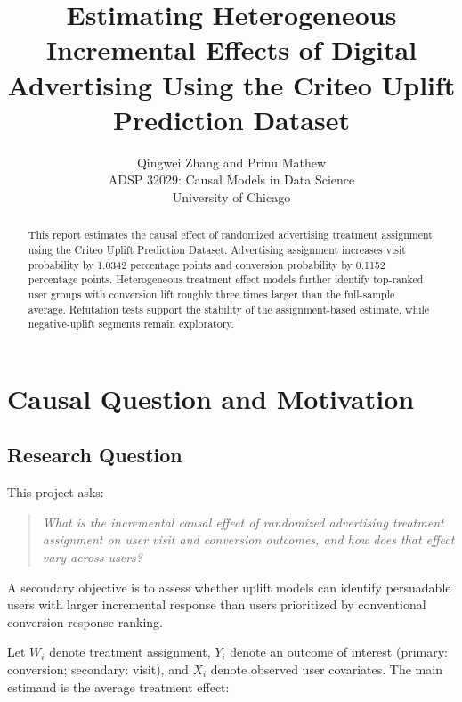 \documentclass[journal,11pt,onecolumn]{IEEEtran}
\begin{document}
\title{Estimating Heterogeneous Incremental Effects of Digital Advertising Using the Criteo Uplift Prediction Dataset}

\author{
    Qingwei Zhang and Prinu Mathew\\
    ADSP 32029: Causal Models in Data Science\\
    University of Chicago
}

\maketitle
\thispagestyle{fancy}

\begin{abstract}
    This report estimates the causal effect of randomized advertising treatment assignment using the Criteo Uplift Prediction Dataset. Advertising assignment increases visit probability by 1.0342 percentage points and conversion probability by 0.1152 percentage points. Heterogeneous treatment effect models further identify top-ranked user groups with conversion lift roughly three times larger than the full-sample average. Refutation tests support the stability of the assignment-based estimate, while negative-uplift segments remain exploratory.
\end{abstract}

\section{Causal Question and Motivation}

\subsection{Research Question}

This project asks:

\begin{quote}
    \emph{What is the incremental causal effect of randomized advertising treatment assignment on user visit and conversion outcomes, and how does that effect vary across users?}
\end{quote}

A secondary objective is to assess whether uplift models can identify persuadable users with larger incremental response than users prioritized by conventional conversion-response ranking.

Let \(W_i\) denote treatment assignment, \(Y_i\) denote an outcome of interest (primary: conversion; secondary: visit), and \(X_i\) denote observed user covariates. The main estimand is the average treatment effect:
\end{document}
